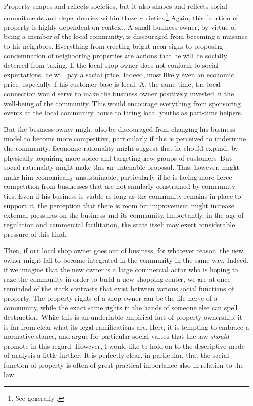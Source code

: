 Property shapes and reflects societies, but it also shapes and reflects social commitments and dependencies within those societies.\footnote{See generally \cite{alexander09}.} Again, this function of property is highly dependent on context. A small business owner, by virtue of being a member of the local community, is discouraged from becoming a nuisance to his neighbors. Everything from erecting bright neon signs to proposing condemnation of neighboring properties are actions that he will be socially deterred from taking. If the local shop owner does not conform to social expectations, he will pay a social price. Indeed, most likely even an economic price, especially if his customer-base is local. At the same time, the local connection would serve to make the business owner positively invested in the well-being of the community. This would encourage everything from sponsoring events at the local community house to hiring local youths as part-time helpers.

But the business owner might also be discouraged from changing his business model to become more competitive, particularly if this is perceived to undermine the community. Economic rationality might suggest that he should expand, by physically acquiring more space and targeting new groups of customers. But social rationality might make this an untenable proposal. This, however, might make him economically unsustainable, particularly if he is facing more fierce competition from businesses that are not similarly constrained by community ties. Even if his business is viable as long as the community remains in place to support it, the perception that there is room for improvement might increase external pressures on the business and its community. Importantly, in the age of regulation and commercial facilitation, the state itself may exert considerable pressure of this kind.

Then, if our local shop owner goes out of business, for whatever reason, the new owner might fail to become integrated in the community in the same way. Indeed, if we imagine that the new owner is a large commercial actor who is hoping to raze the community in order to build a new shopping center, we are at once reminded of the stark contrasts that exist between various social functions of property. The property rights of a shop owner can be the life nerve of a community, while the exact same rights in the hands of someone else can spell destruction. While this is an undeniable empirical fact of property ownership, it is far from clear what its legal ramifications are. Here, it is tempting to embrace a normative stance, and argue for particular social values that the law {\it should} promote in this regard. However, I would like to hold on to the descriptive mode of analysis a little further. It is perfectly clear, in particular, that the social function of property is often of great practical importance also in relation to the law. 

